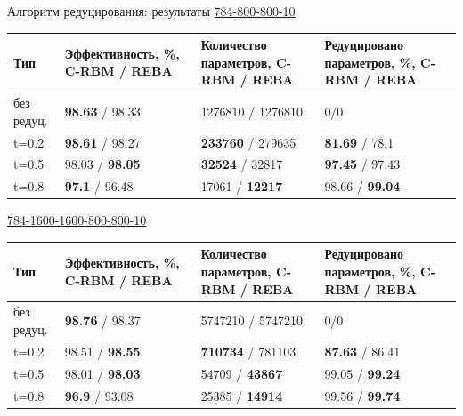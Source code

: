\documentclass[10pt]{beamer}
\begin{document}
        \begin{frame}{Алгоритм редуцирования: результаты}
            \underline{784-800-800-10}
            \begin{table}
              \small
            \centering
            \begin{tabular}{| p{1.5cm} | p{2.5cm} | p{3cm} | p{2.5cm} |}
              \hline
                \textbf{Тип} & \textbf{Эффективность, \%, C-RBM / REBA} & \textbf{Количество параметров, C-RBM / REBA} & \textbf{Редуцировано параметров, \%, C-RBM / REBA}\\
                \hline
                без редуц. & \textbf{98.63} / 98.33 & 1276810 / 1276810 & 0/0\\
                \hline
                t=0.2 & \textbf{98.61} / 98.27 & \textbf{233760} / 279635 & \textbf{81.69} / 78.1\\
                \hline
                t=0.5 & 98.03 / \textbf{98.05} & \textbf{32524} / 32817 & \textbf{97.45} / 97.43\\
                \hline
                t=0.8 & \textbf{97.1} / 96.48 & 17061 / \textbf{12217} & 98.66 / \textbf{99.04}\\
                \hline
            \end{tabular}
            \end{table}

            \underline{784-1600-1600-800-800-10}
            \begin{table}
              \small
            \centering
            \begin{tabular}{| p{1.5cm} | p{2.5cm} | p{3cm} | p{2.5cm} |}
              \hline
                \textbf{Тип} & \textbf{Эффективность, \%, C-RBM / REBA} & \textbf{Количество параметров, C-RBM / REBA} & \textbf{Редуцировано параметров, \%, C-RBM / REBA}\\
                \hline
                без редуц. & \textbf{98.76} / 98.37 & 5747210 / 5747210 & 0/0\\
                \hline
                t=0.2 & 98.51 / \textbf{98.55} & \textbf{710734} / 781103 & \textbf{87.63} / 86.41\\
                \hline
                t=0.5 & 98.01 / \textbf{98.03} & 54709 / \textbf{43867} & 99.05 / \textbf{99.24}\\
                \hline
                t=0.8 & \textbf{96.9} / 93.08 & 25385 / \textbf{14914} & 99.56 / \textbf{99.74}\\
                \hline
            \end{tabular}
            \end{table}  
        \end{frame}
\end{document}
